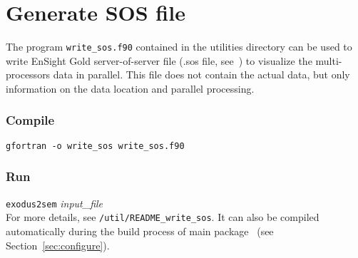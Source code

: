 \section{Generate SOS file}
\label{sec:sos}

The program \texttt{write\_sos.f90} contained in the utilities directory can be used to write EnSight Gold server-of-server file (.sos file, see~\citep{ensight2008}) to visualize the multi-processors data in parallel. This file does not contain the actual data, but only information on the data location and parallel processing.
\subsubsection*{Compile}
\texttt{gfortran -o write\_sos write\_sos.f90}
\subsubsection*{Run}
\texttt{exodus2sem} {\it{input\_file}}\\

For more details, see \texttt{/util/README\_write\_sos}. It can also be compiled automatically during the build process of main package \pack\ (see Section~\ref{sec:configure}).
